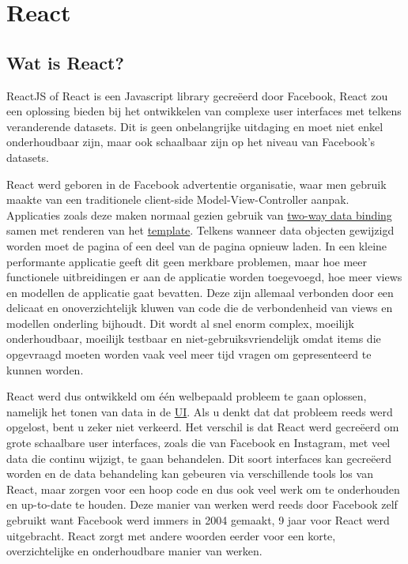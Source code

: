 
\chapter{React}\label{ch:react}

\section{Wat is React?}\label{sec:what}
	
	ReactJS of React is een Javascript library gecreëerd door Facebook, React zou een oplossing bieden bij het ontwikkelen van complexe user interfaces met telkens veranderende datasets. Dit is geen onbelangrijke uitdaging en moet niet enkel onderhoudbaar zijn, maar ook schaalbaar zijn op het niveau van Facebook’s datasets.
	
	React werd geboren in de Facebook advertentie organisatie, waar men gebruik maakte van een traditionele client-side Model-View-Controller aanpak. Applicaties zoals deze maken normaal gezien gebruik van \hyperref[twdb]{two-way data binding} samen met renderen van het \hyperref[template]{template}. Telkens wanneer data objecten gewijzigd worden moet de pagina of een deel van de pagina opnieuw laden. In een kleine performante applicatie geeft dit geen merkbare problemen, maar hoe meer functionele uitbreidingen er aan de applicatie worden toegevoegd, hoe meer views en modellen de applicatie gaat bevatten. Deze zijn allemaal verbonden door een delicaat en onoverzichtelijk kluwen van code die de verbondenheid van views en modellen onderling bijhoudt. Dit wordt al snel enorm complex, moeilijk onderhoudbaar, moeilijk testbaar en niet-gebruiksvriendelijk omdat items die opgevraagd moeten worden vaak veel meer tijd vragen om gepresenteerd te kunnen worden.
	
	React werd dus ontwikkeld om één welbepaald probleem te gaan oplossen, namelijk het tonen van data in de \hyperref[ui]{UI}. Als u denkt dat dat probleem reeds werd opgelost, bent u zeker niet verkeerd. Het verschil is dat React werd gecreëerd om grote schaalbare user interfaces, zoals die van Facebook en Instagram, met veel data die continu wijzigt, te gaan behandelen. Dit soort interfaces kan gecreëerd worden en de data behandeling kan gebeuren via verschillende tools los van React, maar zorgen voor een hoop code en dus ook veel werk om te onderhouden en up-to-date te houden. Deze manier van werken werd reeds door Facebook zelf gebruikt want Facebook werd immers in 2004 gemaakt, 9 jaar voor React werd uitgebracht. React zorgt met andere woorden eerder voor een korte, overzichtelijke en onderhoudbare manier van werken.
	
